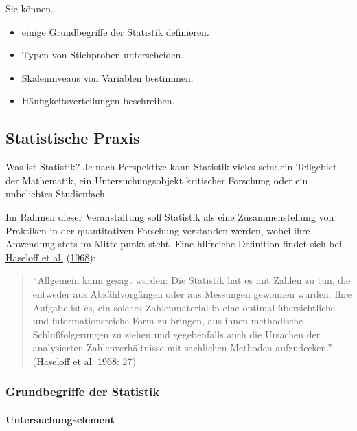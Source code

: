 \documentclass[
  ngerman,
]{article}
\providecommand{\tightlist}{%
  \setlength{\itemsep}{0pt}\setlength{\parskip}{0pt}}
\begin{document}
Sie können\ldots{}

\begin{itemize}
\tightlist
\item
  einige Grundbegriffe der Statistik definieren.
\item
  Typen von Stichproben unterscheiden.
\item
  Skalenniveaus von Variablen bestimmen.
\item
  Häufigkeitsverteilungen beschreiben.
\end{itemize}

\hypertarget{statistische-praxis}{%
\subsection{Statistische Praxis}\label{statistische-praxis}}

Was ist Statistik? Je nach Perspektive kann Statistik vieles sein: ein Teilgebiet der Mathematik, ein Untersuchungsobjekt kritischer Forschung oder ein unbeliebtes Studienfach.

Im Rahmen dieser Veranstaltung soll Statistik als eine Zusammenstellung von Praktiken in der quantitativen Forschung verstanden werden, wobei ihre Anwendung stets im Mittelpunkt steht. Eine hilfreiche Definition findet sich bei \protect\hyperlink{ref-haseloff}{Haseloff et al.} (\protect\hyperlink{ref-haseloff}{1968}):

\begin{quote}
``Allgemein kann gesagt werden: Die Statistik hat es mit Zahlen zu tun, die entweder aus Abzählvorgängen oder aus Messungen gewonnen wurden. Ihre Aufgabe ist es, ein solches Zahlenmaterial in eine optimal übersichtliche und informationsreiche Form zu bringen, aus ihnen methodische Schlußfolgerungen zu ziehen und gegebenfalls auch die Ursachen der analysierten Zahlenverhältnisse mit sachlichen Methoden aufzudecken.'' (\protect\hyperlink{ref-haseloff}{Haseloff et al. 1968}: 27)
\end{quote}

\hypertarget{grundbegriffe-der-statistik}{%
\subsubsection{Grundbegriffe der Statistik}\label{grundbegriffe-der-statistik}}

\hypertarget{untersuchungselement}{%
\paragraph{Untersuchungselement}\label{untersuchungselement}}
\end{document}
